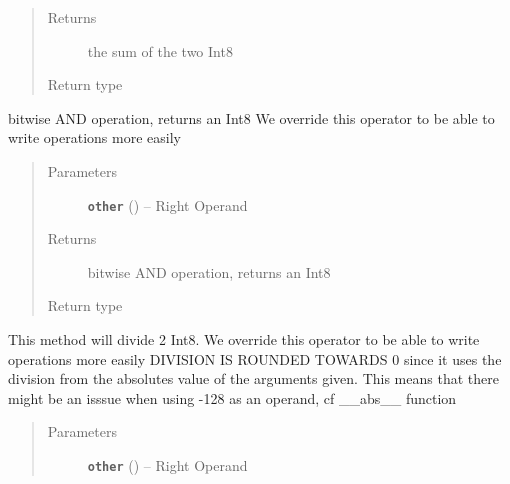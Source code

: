 \documentclass[letterpaper,10pt,english]{sphinxmanual}
\begin{document}
\begin{fulllineitems}
\begin{fulllineitems}
\begin{quote}
\begin{description}
\item[{Returns}] \leavevmode
the sum of the two Int8

\item[{Return type}] \leavevmode
{\hyperref[datatypes.integers:datatypes.integers.Int8.Int8]{}}

\end{description}\end{quote}

\end{fulllineitems}


\begin{fulllineitems}
\label{datatypes.integers:datatypes.integers.Int8.Int8.__and__}
bitwise AND operation, returns an Int8
We override this operator to be able to write operations more easily
\begin{quote}\begin{description}
\item[{Parameters}] \leavevmode
\textbf{\texttt{other}} ({\hyperref[datatypes.integers:datatypes.integers.Int8.Int8]{}}) -- Right Operand

\item[{Returns}] \leavevmode
bitwise AND operation, returns an Int8

\item[{Return type}] \leavevmode
{\hyperref[datatypes.integers:datatypes.integers.Int8.Int8]{}}

\end{description}\end{quote}

\end{fulllineitems}


\begin{fulllineitems}
\label{datatypes.integers:datatypes.integers.Int8.Int8.__div__}
This method will divide 2 Int8.
We override this operator to be able to write operations more easily
DIVISION IS ROUNDED TOWARDS 0 since it uses the division from the absolutes value of the arguments given.
This means that there might be an isssue when using -128 as an operand, cf \_\_abs\_\_ function
\begin{quote}\begin{description}
\item[{Parameters}] \leavevmode
\textbf{\texttt{other}} ({\hyperref[datatypes.integers:datatypes.integers.Int8.Int8]{}}) -- Right Operand


\end{description}
\end{quote}
\end{fulllineitems}
\end{fulllineitems}
\end{document}
